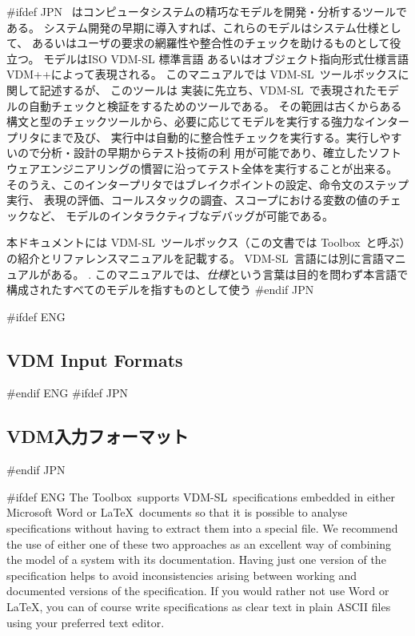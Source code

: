 \documentclass[\pformat,12pt]{article}
\newcommand{\vdmslpp}{VDM-SL}
\newcommand{\Toolbox}{Toolbox}
\newcommand{\vdmslpp}{VDM++}
\newcommand{\Toolbox}{Toolbox}
\begin{document}
#ifdef JPN
\VDMTools\ はコンピュータシステムの精巧なモデルを開発・分析するツールである。
システム開発の早期に導入すれば、これらのモデルはシステム仕様として、
あるいはユーザの要求の網羅性や整合性のチェックを助けるものとして役立つ。
モデルはISO VDM-SL 標準言語\cite{ISOVDM96}
あるいはオブジェクト指向形式仕様言語VDM++\cite{LangManPP-CSK}\cite{Fitzgerald&05}によって表現される。
このマニュアルでは \vdmslpp\ ツールボックスに関して記述するが、
このツールは 実装に先立ち、\vdmslpp\ で表現されたモデルの自動チェックと検証をするためのツールである。
その範囲は古くからある構文と型のチェックツールから、必要に応じてモデルを実行する強力なインタープリタにまで及び、
実行中は自動的に整合性チェックを実行する。実行しやすいので分析・設計の早期からテスト技術の利
用が可能であり、確立したソフトウェアエンジニアリングの慣習に沿ってテスト全体を実行することが出来る。
そのうえ、このインタープリタではブレイクポイントの設定、命令文のステップ実行、
表現の評価、コールスタックの調査、スコープにおける変数の値のチェックなど、
モデルのインタラクティブなデバッグが可能である。

本ドキュメントには \vdmslpp\ ツールボックス（この文書では \Toolbox\ と呼ぶ）の紹介とリファレンスマニュアルを記載する。
\vdmslpp\ 言語には別に言語マニュアルがある。
.
このマニュアルでは、{\em 仕様\/}という言葉は目的を問わず本言語で構成されたすべてのモデルを指すものとして使う
#endif JPN

#ifdef ENG
\subsection*{VDM Input Formats}
#endif ENG
#ifdef JPN
\subsection*{VDM入力フォーマット}
#endif JPN

#ifdef ENG
The \Toolbox\ supports \vdmslpp\ specifications embedded in either
Microsoft Word or \LaTeX\ documents so that it is possible to analyse
specifications without having to extract them into a special file. We
recommend the use of either one of these two approaches as an
excellent way of combining the model of a system with its
documentation. Having just one version of the specification helps to
avoid inconsistencies arising between working and documented versions
of the specification. If you would rather not use Word or \LaTeX, you
can of course write specifications as clear text in plain ASCII files
using your preferred text editor.
\end{document}
